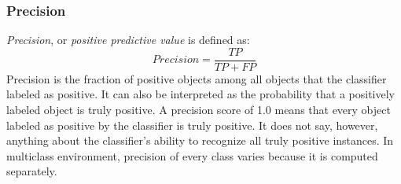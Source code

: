 \documentclass[11pt]{article}
\begin{document}
      \subsubsection{Precision}
        {\it Precision}, or {\it positive predictive value} \cite{confusion} is defined as:
        \begin{equation}
          Precision = \frac{TP}{TP + FP}
        \end{equation}
        Precision is the fraction of positive objects among all objects that the classifier labeled as positive. It can also be interpreted as the probability that a positively labeled object is truly positive. A precision score of 1.0 means that every object labeled as positive by the classifier is truly positive. It does not say, however, anything about the classifier's ability to recognize all truly positive instances. In multiclass environment, precision of every class varies because it is computed separately.
\end{document}
